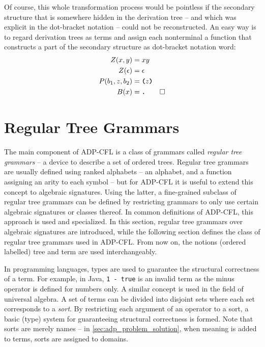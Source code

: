 \documentclass[
    a4paper,
    12pt,
    twoside,
    BCOR=12mm,
    parskip=half,
    chapterprefix,
    numbers=noenddot,
    bibliography=totoc
]{scrbook}
\begin{document}
\begin{example}
	Of course, this whole transformation process would be pointless if the secondary structure that is somewhere hidden in the derivation tree -- and which was explicit in the dot-bracket notation -- could not be reconstructed. An easy way is to regard derivation trees as terms and assign each nonterminal a function that constructs a part of the secondary structure as dot-bracket notation word:	
	\begin{align*}
		Z(x,y) &= xy\\
		Z(\epsilon) &= \epsilon\\
		P(b_1,z,b_2) &= \ts{(}z\ts{)}\\
		B(x) &= \ts{.} \qedhere
	\end{align*}
\end{example}

\section{Regular Tree Grammars}
\label{sec:regular_tree_grammars}

The main component of ADP-CFL is a class of grammars called \emph{regular tree grammars} \citep{brainerd_tree_1969} -- a device to describe a set of ordered trees. Regular tree grammars are usually defined using ranked alphabets -- an alphabet, and a function assigning an arity to each symbol -- but for ADP-CFL it is useful to extend this concept to algebraic signatures. Using the latter, a fine-grained subclass of regular tree grammars can be defined by restricting grammars to only use certain algebraic signatures or classes thereof. In common definitions of ADP-CFL, this approach is used and specialized. In this section, regular tree grammars over algebraic signatures are introduced, while the following section defines the class of regular tree grammars used in ADP-CFL. From now on, the notions (ordered labelled) tree and term are used interchangeably.

In programming languages, types are used to guarantee the structural correctness of a term. For example, in Java, \verb|1 - true| is an invalid term as the minus operator is defined for numbers only. A similar concept is used in the field of universal algebra. A set of terms can be divided into disjoint sets where each set corresponds to a \emph{sort}. By restricting each argument of an operator to a sort, a basic (type) system for guaranteeing structural correctness is formed. Note that sorts are merely names -- in \cref{sec:adp_problem_solution}, when meaning is added to terms, sorts are assigned to domains.
\end{document}
